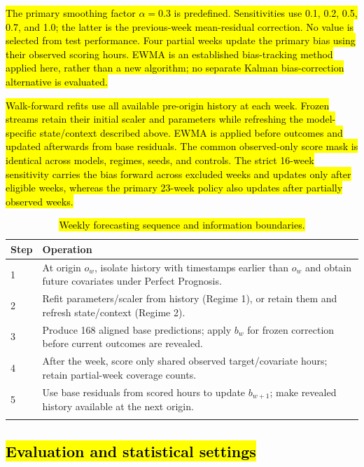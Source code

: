 \documentclass[pdflatex,sn-basic,Numbered]{sn-jnl}
\newcommand{\rev}[1]{\hl{#1}}
\begin{document}
\rev{The primary smoothing factor $\alpha=0.3$ is predefined. Sensitivities use 0.1, 0.2, 0.5, 0.7, and 1.0; the latter is the previous-week mean-residual correction. No value is selected from test performance. Four partial weeks update the primary bias using their observed scoring hours. EWMA is an established bias-tracking method applied here, rather than a new algorithm; no separate Kalman bias-correction alternative is evaluated.}

\rev{Walk-forward refits use all available pre-origin history at each week. Frozen streams retain their initial scaler and parameters while refreshing the model-specific state/context described above. EWMA is applied before outcomes and updated afterwards from base residuals. The common observed-only score mask is identical across models, regimes, seeds, and controls. The strict 16-week sensitivity carries the bias forward across excluded weeks and updates only after eligible weeks, whereas the primary 23-week policy also updates after partially observed weeks.}

\begin{table}[htbp]
\caption{\rev{Weekly forecasting sequence and information boundaries.}}
\label{tab:pseudocode}
\begingroup\small\setlength{\tabcolsep}{4pt}
\begin{tabularx}{\linewidth}{@{}l>{\raggedright\arraybackslash}X@{}}
\toprule
Step & Operation \\
\midrule
1 & At origin $o_w$, isolate history with timestamps earlier than $o_w$ and obtain future covariates under Perfect Prognosis. \\
2 & Refit parameters/scaler from history (Regime 1), or retain them and refresh state/context (Regime 2). \\
3 & Produce 168 aligned base predictions; apply $b_w$ for frozen correction before current outcomes are revealed. \\
4 & After the week, score only shared observed target/covariate hours; retain partial-week coverage counts. \\
5 & Use base residuals from scored hours to update $b_{w+1}$; make revealed history available at the next origin. \\
\botrule
\end{tabularx}\endgroup
\end{table}

\subsection{\texorpdfstring{\rev{Evaluation and statistical settings}}{Evaluation and statistical settings}}\label{subsec:impl_evaluation}
\end{document}
